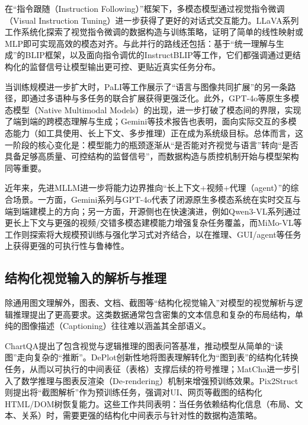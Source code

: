 在“指令跟随（Instruction Following）”框架下，多模态模型通过视觉指令微调（Visual Instruction Tuning）进一步获得了更好的对话式交互能力。LLaVA系列工作系统化探索了视觉指令微调的数据构造与训练策略，证明了简单的线性映射或MLP即可实现高效的模态对齐\citep{liu2024visual,liu2023improved}。与此并行的路线还包括：基于“统一理解与生成”的BLIP框架\citep{li2022blip}，以及面向指令调优的InstructBLIP等工作\citep{dai2023instructblip}，它们都强调通过更结构化的监督信号让模型输出更可控、更贴近真实任务分布。

当训练规模进一步扩大时，PaLI等工作展示了“语言与图像共同扩展”的另一条路径，即通过多语种与多任务的联合扩展获得更强泛化\citep{chen2022pali}。此外，GPT-4o等原生多模态模型（Native Multimodal Models）的出现，进一步打破了模态间的界限，实现了端到端的跨模态理解与生成\citep{openai2024gpt4o}；Gemini等技术报告也表明，面向实际交互的多模态能力（如工具使用、长上下文、多步推理）正在成为系统级目标\citep{team2023gemini}。总体而言，这一阶段的核心变化是：模型能力的瓶颈逐渐从“是否能对齐视觉与语言”转向“是否具备足够高质量、可控结构的监督信号”，而数据构造与质控机制开始与模型架构同等重要。

近年来，先进MLLM进一步将能力边界推向“长上下文+视频+代理（agent）”的综合场景。一方面，Gemini系列与GPT-4o代表了闭源原生多模态系统在实时交互与端到端建模上的方向\citep{team2023gemini,openai2024gpt4o}；另一方面，开源侧也在快速演进，例如Qwen3-VL系列通过更长上下文与更强的视频/交错多模态建模能力增强复杂任务覆盖\citep{qwen3vl2025}，而MiMo-VL等工作则探索将大规模预训练与强化学习式对齐结合，以在推理、GUI/agent等任务上获得更强的可执行性与鲁棒性\citep{mimovl2025}。

\subsection{结构化视觉输入的解析与推理}
除通用图文理解外，图表、文档、截图等“结构化视觉输入”对模型的视觉解析与逻辑推理提出了更高要求。这类数据通常包含密集的文本信息和复杂的布局结构，单纯的图像描述（Captioning）往往难以涵盖其全部语义。

ChartQA提出了包含视觉与逻辑推理的图表问答基准，推动模型从简单的“读图”走向复杂的“推断”\citep{masry2022chartqa}。DePlot创新性地将图表理解转化为“图到表”的结构化转换任务，从而以可执行的中间表征（表格）支撑后续的符号推理\citep{liu2022deplot}；MatCha进一步引入了数学推理与图表反渲染（De-rendering）机制来增强预训练效果\citep{liu2022matcha}。Pix2Struct则提出将“截图解析”作为预训练任务，强调对UI、网页等截图的结构化HTML/DOM树恢复能力\citep{lee2023pix2struct}。这些工作共同表明：当任务依赖结构化信息（布局、文本、关系）时，需要更强的结构化中间表示与针对性的数据构造策略。

